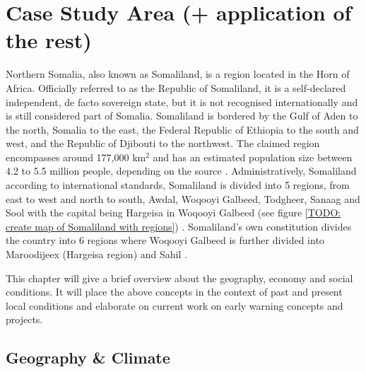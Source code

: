 \section{Case Study Area (+ application of the rest)}\label{sec:case_area} %

Northern Somalia, also known as Somaliland, is a region located in the Horn of Africa. Officially referred to as the Republic of Somaliland, it is a self-declared independent, de facto sovereign state, but it is not recognised internationally and is still considered part of Somalia. Somaliland is bordered by the Gulf of Aden to the north, Somalia to the east, the Federal Republic of Ethiopia to the south and west, and the Republic of Djibouti to the northwest. The claimed region encompasses around 177,000 km$^2$ and has an estimated population size between 4.2 to 5.5 million people, depending on the source \autocite{petrucciLandscapeLandformsNorthern2022,republicofsomaliaCountryProfile20212021,somaliredcrescentsocietyFeasibilityStudyPotential2022}. Administratively, Somaliland according to international standards, Somaliland is divided into 5 regions, from east to west and north to south, Awdal, Woqooyi Galbeed, Todgheer, Sanaag and Sool with the capital being Hargeisa in Woqooyi Galbeed (see figure \ref*{TODO: create map of Somaliland with regions}) \autocite{republicofsomaliaCountryProfile20212021}. Somaliland's own constitution divides the country into 6 regions where Woqooyi Galbeed is further divided into Maroodijeex (Hargeisa region) and Sahil \autocite{republicofsomalilandRegionsDistrictsSelfmanagement2019}.


This chapter will give a brief overview about the geography, economy and social conditions. It will place the above concepts in the context of past and present local conditions and elaborate on current work on early warning concepts and projects. 


\subsection{Geography \& Climate}

